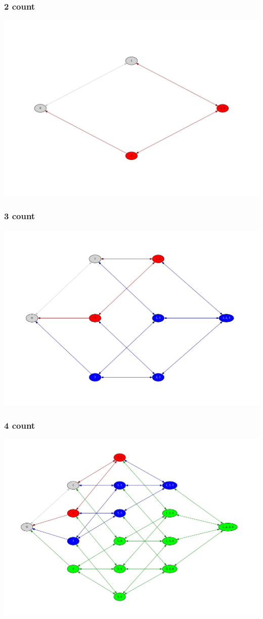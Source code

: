 \documentclass[10pt]{beamer}
\begin{document}
\begin{frame}
  \frametitle{2 count}
  \centering

  \includegraphics[width=\textwidth]{timed_automata/count2.pdf}
\end{frame}

\begin{frame}
  \frametitle{3 count}
  \centering

  \includegraphics[width=\textwidth]{timed_automata/count3.pdf}
\end{frame}

\begin{frame}
  \frametitle{4 count}
  \centering

  \includegraphics[width=\textwidth]{timed_automata/count4.pdf}
\end{frame}

{\aauwavesbg
\begin{frame}
\end{frame}}
\end{document}
